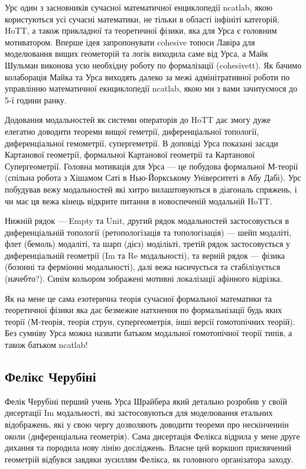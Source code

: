 Урс один з засновників сучасної математичної енциклопедії ncatlab,
якою користуються усі сучасні математики, не тільки в області інфініті
категорій, HoTT, а також прикладної та теоретичної фізики, яка для Урса
є головним мотиватором. Вперше ідея запропонувати cohesive топоси Лавіра
для моделювання вищих геометорій та логік виходила саме від Урса, а Майк
Шульман виконова усю необхідну роботу по формалізації (cohesivett). Як
бачимо колаборація Майка та Урса виходять далеко за межі адмінітративної
роботи по управлінню математичної екнциклопедії ncatlab, якою ми з вами
зачитуємося до 5-ї години ранку.

Додовання модальностей як системи операторів до HoTT дає
змогу дуже елегатно доводити теореми вищої геметрії, диференціальної
топології, диференціальної гемометрії, супергеметрії. В доповіді Урса
показані засади Картанової геометрії, формальної Картанової геометрії
та Картанової Супергеометрії. Головна мотивація для Урса --- це побудова
формальної М-теорії (спільна робота з Хішамом Саті в Нью-Йоркському
Університеті в Абу Дабі). Урс побудував вежу модальностей які хитро
вилаштовуються в діагональ спряжень, і чи має ця вежа кінець відкрите
питання в новоспеченій модальній HoTT.

Нижній рядок --- Empty та Unit, другий рядок модальностей
застосовується в диференціальній топології (ретопологізація та
топологізація) --- шейп модаліті, флет (бемоль) модаліті, та
шарп (дієз) моділіьті, третій рядок застосовується у диференціальній
геометрії (Im та Re модальності), та верній рядок --- фізика (бозонні
та ферміонні модальності), далі вежа насичується та
стабілізується (начебто?). Синім кольором зображені мотивні
локалізації афінного відрізка.

Як на мене це сама езотерична теорія сучасної формальної математики
та теоретичної фізики яка дає безмежне натхнення по формальнізації
будь яких теорії (М-теорія, теорія струн, супергеометрія, інші версії
гомотопічних теорій). Без сумніву Урса можна назвати батьком модальної
гомотопічної теорії типів, а також батьком ncatlab!

\subsection*{Фелікс Черубіні}

Фелік Черубіні перший учень Урса Шрайбера який детально розробив у
своїй дисертації Im модальності, які застосовуються для моделювання
етальних відображень, які у свою чергу дозволяють доводити теореми
про нескінченнін околи (диференціальна геометрія). Сама дисертація Фелікса
відрила у мене друге дихання та породила нову лінію досліджень.
Власне цей воркшоп присвячений геометрій відбувся завдяки зусиллям Фелікса,
як головного організатора заходу.

